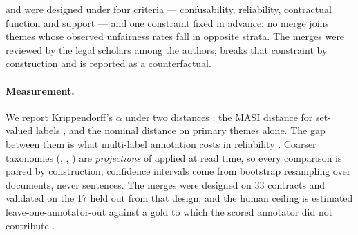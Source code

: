  and  were designed under four criteria --- confusability,
reliability, contractual function and support --- and one constraint fixed in
advance: no merge joins themes whose observed unfairness rates fall in opposite
strata. The merges were reviewed by the legal scholars among the authors;
 breaks that constraint by construction and is reported as a
counterfactual.

\paragraph{Measurement.}
We report Krippendorff's $\alpha$ under two distances
\cite{krippendorff2018content,artstein2008intercoder}: the MASI distance for
set-valued labels \cite{passonneau2006masi}, and the nominal distance on primary
themes alone. The gap between them is what multi-label annotation costs in
reliability \cite{marchal2022multilabel}. Coarser taxonomies (, ,
) are \emph{projections} of  applied at read time, so every comparison
is paired by construction; confidence intervals come from bootstrap resampling
over documents, never sentences. The merges were designed on 33 contracts and validated on the
17 held out from that design, and the human ceiling is estimated
leave-one-annotator-out against a gold to which the scored annotator did not
contribute \cite{nangia2019human}.
